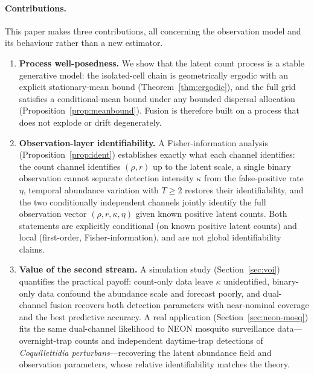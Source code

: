 \documentclass[preprint,12pt]{elsarticle}
\theoremstyle{definition}
\begin{document}
\paragraph{Contributions.}
This paper makes three contributions, all concerning the observation model
and its behaviour rather than a new estimator.
\begin{enumerate}[label=\textbf{\arabic*.},leftmargin=1.6em]
  \item \textbf{Process well-posedness.} We show that the latent count
    process is a stable generative model: the isolated-cell chain is
    geometrically ergodic with an explicit stationary-mean bound
    (Theorem~\ref{thm:ergodic}), and the full grid satisfies a
    conditional-mean bound under any bounded dispersal allocation
    (Proposition~\ref{prop:meanbound}). Fusion is therefore built on a
    process that does not explode or drift degenerately.
  \item \textbf{Observation-layer identifiability.} A Fisher-information
    analysis (Proposition~\ref{prop:ident}) establishes exactly what each
    channel identifies: the count channel identifies $(\rho,r)$ up to the
    latent scale, a single binary observation cannot separate detection
    intensity $\kappa$ from the false-positive rate $\eta$, temporal
    abundance variation with $T\ge 2$ restores their identifiability, and
    the two conditionally independent channels jointly identify the full
    observation vector $(\rho,r,\kappa,\eta)$ given known positive latent
    counts. Both statements are explicitly conditional (on known positive
    latent counts) and local (first-order, Fisher-information), and are not
    global identifiability claims.
  \item \textbf{Value of the second stream.} A simulation study
    (Section~\ref{sec:voi}) quantifies the practical payoff: count-only
    data leave $\kappa$ unidentified, binary-only data confound the
    abundance scale and forecast poorly, and dual-channel fusion recovers
    both detection parameters with near-nominal coverage and the best
    predictive accuracy. A real application
    (Section~\ref{sec:neon-mosq}) fits the same dual-channel likelihood to NEON
    mosquito surveillance data---overnight-trap counts and independent
    daytime-trap detections of \emph{Coquillettidia perturbans}---recovering the
    latent abundance field and observation parameters, whose relative
    identifiability matches the theory.
\end{enumerate}
\end{document}

